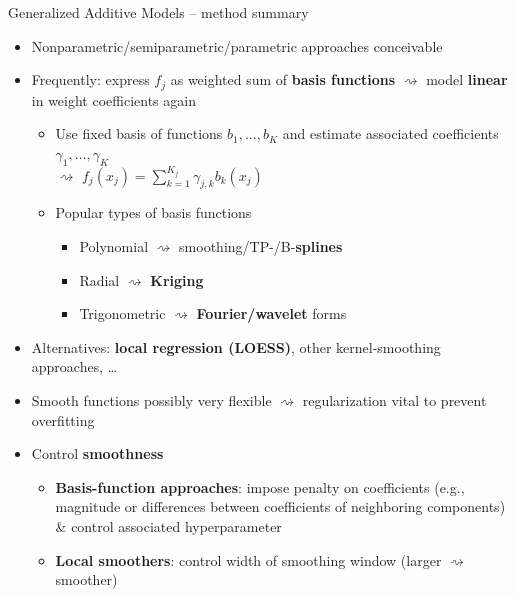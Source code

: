 \begin{vbframe}{Generalized Additive Models -- method summary}
\begin{itemize}
  \item Nonparametric/semiparametric/parametric approaches conceivable
  \item Frequently: express $f_j$ as weighted sum of \textbf{basis functions}
  $\rightsquigarrow$ model \textbf{linear} in weight coefficients again
  \begin{itemize}
      \item Use fixed basis of functions $b_1, \dots, b_K$ and estimate
      associated coefficients $\gamma_1, \dots, \gamma_K$ \\ $\rightsquigarrow$
      $f_j(x_j) = \sum_{k=1}^{K_j} \gamma_{j, k} b_k(x_j)$
      \item Popular types of basis functions
      \begin{itemize}
        \footnotesize
        \item Polynomial $\rightsquigarrow$ smoothing/TP-/B-\textbf{splines}
        \item Radial $\rightsquigarrow$ \textbf{Kriging}
        \item Trigonometric $\rightsquigarrow$ \textbf{Fourier/wavelet} forms
      \end{itemize}
    \end{itemize}
    \item Alternatives: \textbf{local regression (LOESS)}, other
    kernel-smoothing approaches, \dots
\end{itemize}

\medskip

\begin{itemize}
    \item Smooth functions possibly very flexible $\rightsquigarrow$
    regularization vital to prevent overfitting
    \item Control \textbf{smoothness}
    \begin{itemize}
      \item \textbf{Basis-function approaches}: impose penalty on coefficients
      (e.g., magnitude or differences between coefficients of neighboring
      components) \& control associated hyperparameter
      \item \textbf{Local smoothers}: control width of smoothing window
      (larger $\rightsquigarrow$ smoother)
    \end{itemize}
\end{itemize}

\end{vbframe}

